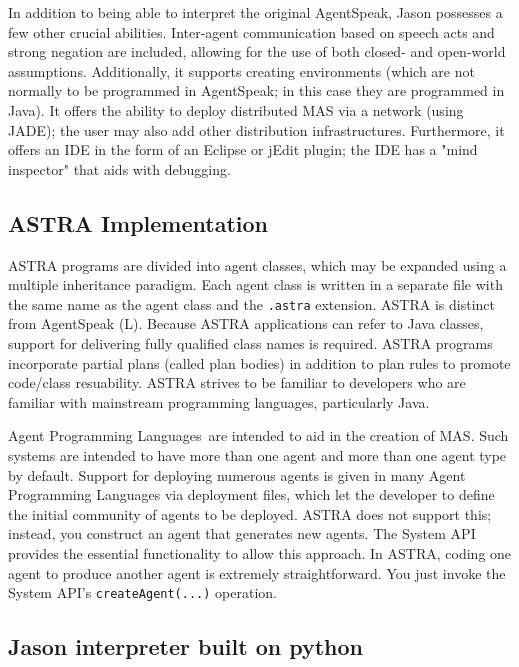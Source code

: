 \vspace{.5cm}

In addition to being able to interpret the original AgentSpeak, Jason possesses a few other crucial abilities. Inter-agent communication based on speech acts and strong negation are included, allowing for the use of both closed- and open-world assumptions. Additionally, it supports creating environments (which are not normally to be programmed in AgentSpeak; in this case they are programmed in Java). It offers the ability to deploy distributed \ac{MAS} via a network (using \ac{JADE}); the user may also add other distribution infrastructures. Furthermore, it offers an \ac{IDE} in the form of an Eclipse or jEdit plugin; the \ac{IDE} has a "mind inspector" that aids with debugging.

\subsection{\ac{ASTRA} Implementation}

\ac{ASTRA} programs are divided into agent classes, which may be expanded using a multiple inheritance paradigm. Each agent class is written in a separate file with the same name as the agent class and the \texttt{.astra} extension. \ac{ASTRA} is distinct from AgentSpeak (L). Because \ac{ASTRA} applications can refer to Java classes, support for delivering fully qualified class names is required. \ac{ASTRA} programs incorporate partial plans (called plan bodies) in addition to plan rules to promote code/class resuability. \ac{ASTRA} strives to be familiar to developers who are familiar with mainstream programming languages, particularly Java.

 \vspace{.5cm}
 
Agent Programming Languages are intended to aid in the creation of MAS. Such systems are intended to have more than one agent and more than one agent type by default. Support for deploying numerous agents is given in many Agent Programming Languages via deployment files, which let the developer to define the initial community of agents to be deployed. \ac{ASTRA} does not support this; instead, you construct an agent that generates new agents. The System \ac{API} provides the essential functionality to allow this approach. In \ac{ASTRA}, coding one agent to produce another agent is extremely straightforward. You just invoke the System \ac{API}'s \texttt{createAgent(...)} operation.

\subsection{Jason interpreter built on python}

